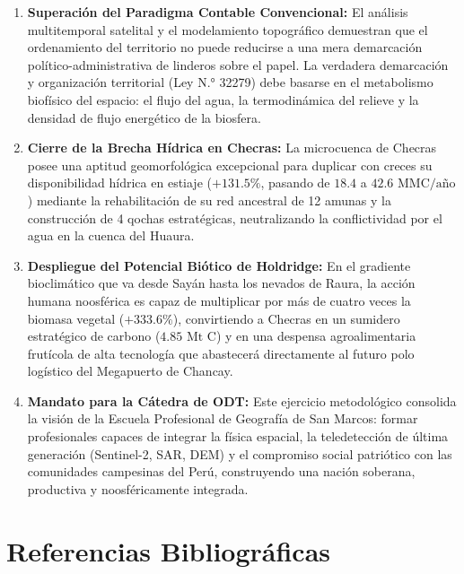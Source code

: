 \documentclass[11pt,a4paper]{article}
\begin{document}
\begin{enumerate}[leftmargin=*]
    \item \textbf{Superación del Paradigma Contable Convencional:} El análisis multitemporal satelital y el modelamiento topográfico demuestran que el ordenamiento del territorio no puede reducirse a una mera demarcación político-administrativa de linderos sobre el papel. La verdadera demarcación y organización territorial (Ley N.° 32279) debe basarse en el metabolismo biofísico del espacio: el flujo del agua, la termodinámica del relieve y la densidad de flujo energético de la biosfera.
    \item \textbf{Cierre de la Brecha Hídrica en Checras:} La microcuenca de Checras posee una aptitud geomorfológica excepcional para duplicar con creces su disponibilidad hídrica en estiaje ($+131.5\%$, pasando de $18.4$ a $42.6\text{ MMC/año}$) mediante la rehabilitación de su red ancestral de 12 amunas y la construcción de 4 qochas estratégicas, neutralizando la conflictividad por el agua en la cuenca del Huaura.
    \item \textbf{Despliegue del Potencial Biótico de Holdridge:} En el gradiente bioclimático que va desde Sayán hasta los nevados de Raura, la acción humana noosférica es capaz de multiplicar por más de cuatro veces la biomasa vegetal ($+333.6\%$), convirtiendo a Checras en un sumidero estratégico de carbono ($4.85\text{ Mt C}$) y en una despensa agroalimentaria frutícola de alta tecnología que abastecerá directamente al futuro polo logístico del Megapuerto de Chancay.
    \item \textbf{Mandato para la Cátedra de ODT:} Este ejercicio metodológico consolida la visión de la Escuela Profesional de Geografía de San Marcos: formar profesionales capaces de integrar la física espacial, la teledetección de última generación (Sentinel-2, SAR, DEM) y el compromiso social patriótico con las comunidades campesinas del Perú, construyendo una nación soberana, productiva y noosféricamente integrada.
\end{enumerate}

\newpage

\section*{Referencias Bibliográficas}
\end{document}
